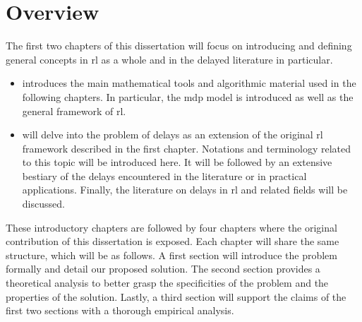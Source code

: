 \section{Overview}
The first two chapters of this dissertation will focus on introducing and defining general concepts in \gls{rl} as a whole and in the delayed literature in particular.

\begin{itemize}
    \item {} introduces the main mathematical tools and algorithmic material used in the following chapters. 
    In particular, the \gls{mdp} model is introduced as well as the general framework of  \gls{rl}. 
    \item {} will delve into the problem of delays as an extension of the original \gls{rl} framework described in the first chapter.
    Notations and terminology related to this topic will be introduced here.
    It will be followed by an extensive bestiary of the delays encountered in the literature or in practical applications.
    Finally, the literature on delays in \gls{rl} and related fields will be discussed. 
\end{itemize}

\noindent These introductory chapters are followed by four chapters where the original contribution of this dissertation is exposed. Each chapter will share the same structure, which will be as follows. A first section will introduce the problem formally and detail our proposed solution. The second section provides a theoretical analysis to better grasp the specificities of the problem and the properties of the solution.
Lastly, a third section will support the claims of the first two sections with a thorough empirical analysis. 

